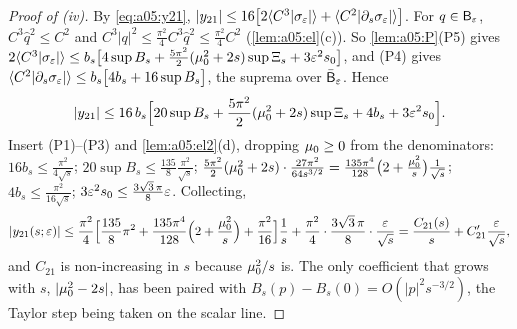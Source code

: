 \begin{proof}[Proof of (iv)]
By \eqref{eq:a05:y21}, $|y_{21}|\le16\big[2\langle C^3|\sigma_{\varepsilon}|\rangle+\langle C^2|\partial_s\sigma_{\varepsilon}|\rangle\big]$. For $q\in\mathsf B_{\varepsilon}$, $C^3\hat q^2\le C^2$ and $C^3|q|^2\le\frac{\pi^2}4C^3\hat q^2\le\frac{\pi^2}4C^2$ (\cref{lem:a05:el}(c)). So \cref{lem:a05:P}(P5) gives $2\langle C^3|\sigma_{\varepsilon}|\rangle\le b_s\big[4\sup B_s+\frac{5\pi^2}2(\mu_0^2+2s)\sup\Xi_s+3\varepsilon^2s_0\big]$, and (P4) gives $\langle C^2|\partial_s\sigma_{\varepsilon}|\rangle\le b_s\big[4b_s+16\sup B_s\big]$, the suprema over $\bar{\mathsf B}_{\varepsilon}$. Hence
\[
|y_{21}|\le16\,b_s\Big[20\sup B_s+\frac{5\pi^2}2(\mu_0^2+2s)\sup\Xi_s+4b_s+3\varepsilon^2s_0\Big].
\]
Insert (P1)--(P3) and \cref{lem:a05:el2}(d), dropping $\mu_0\ge0$ from the denominators: $16b_s\le\frac{\pi^2}{4\sqrt s}$; $20\sup B_s\le\frac{135}8\frac{\pi^2}{\sqrt s}$; $\frac{5\pi^2}2(\mu_0^2+2s)\cdot\frac{27\pi^2}{64s^{3/2}}=\frac{135\pi^4}{128}\big(2+\frac{\mu_0^2}s\big)\frac1{\sqrt s}$; $4b_s\le\frac{\pi^2}{16\sqrt s}$; $3\varepsilon^2s_0\le\frac{3\sqrt3\,\pi}8\varepsilon$. Collecting,
\[
|y_{21}(s;\varepsilon)|\le\frac{\pi^2}4\Big[\frac{135}8\pi^2+\frac{135\pi^4}{128}\Big(2+\frac{\mu_0^2}s\Big)+\frac{\pi^2}{16}\Big]\frac1s+\frac{\pi^2}4\cdot\frac{3\sqrt3\,\pi}8\cdot\frac{\varepsilon}{\sqrt s}=\frac{C_{21}(s)}s+C'_{21}\frac{\varepsilon}{\sqrt s},
\]
and $C_{21}$ is non-increasing in $s$ because $\mu_0^2/s$ is. The only coefficient that grows with $s$, $|\mu_0^2-2s|$, has been paired with $B_s(p)-B_s(0)=O(|p|^2s^{-3/2})$, the Taylor step being taken on the scalar line.
\end{proof}
